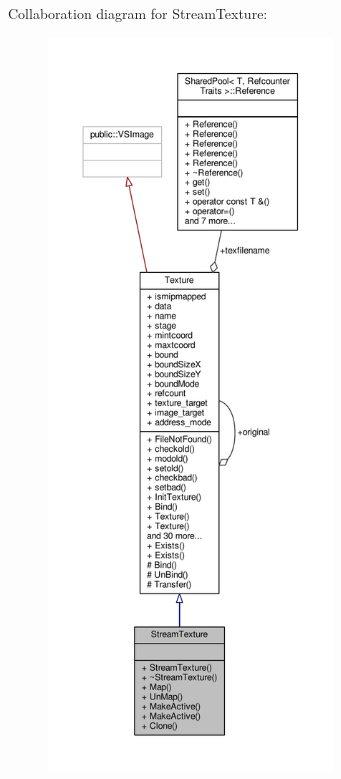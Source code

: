 Collaboration diagram for Stream\+Texture\+:
\nopagebreak
\begin{figure}[H]
\begin{center}
\leavevmode
\includegraphics[height=550pt]{d5/dee/classStreamTexture__coll__graph}
\end{center}
\end{figure}
